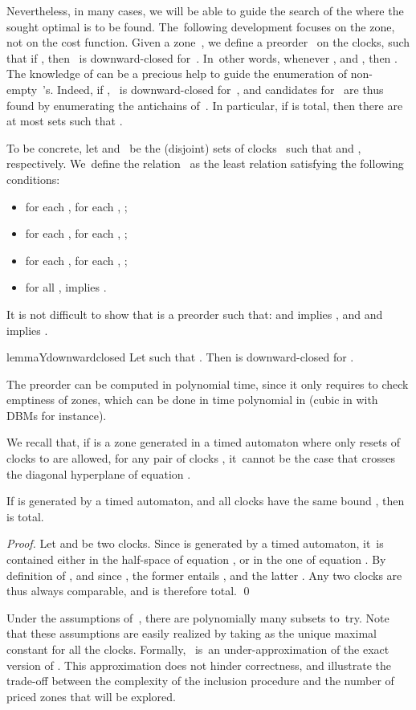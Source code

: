 Nevertheless, in many cases, we will be able to guide the search of the 
where the sought optimal is to be found.
The~following development
focuses on the zone, not on the cost function. Given a zone~, we define a
preorder~ on the clocks, such that if , then
~is downward-closed for~. In~other words, whenever ,
 and , then . The knowledge of 
can be a precious help to guide the enumeration of non-empty~'s.
Indeed, if , ~is downward-closed for~, and
candidates for~ are thus found by enumerating the antichains of~.
In particular, if  is total, then there are at most  sets 
such that .

To be concrete, 
let  and~ be the (disjoint) sets of clocks~ such that  and , respectively.
We~define the relation~ as the
least
relation satisfying the following conditions:
\begin{itemize}
\item for each , for each , ;
\item for each , for each , ;
\item for each , for each , ;
\item for all ,  implies .
\end{itemize}
It is not difficult to show that  is a preorder such that:
 and  implies , and
 and  implies .

\begin{restatable}{lemma}{Ydownwardclosed}
  Let  such that . Then  is
  downward-closed for .
\end{restatable}

The preorder  can be computed in polynomial time, since it
only requires to check emptiness of zones, which can be done in time
polynomial in  (cubic in  with DBMs for instance).

We recall that, if  is a zone generated in a timed automaton where
only resets of clocks to  are allowed, for any pair of clocks
, it~cannot be the case that  crosses the diagonal hyperplane of
equation . 

\begin{proposition}
  \label{prop:total_samebound}
  If  is generated by a timed automaton, and all clocks have the
  same bound , then  is total.
\end{proposition}

\begin{proof}
  Let  and  be two clocks. Since  is generated by a timed automaton,
  it~is contained either in the half-space of equation , or in the
  one of equation . By definition of , and since , the former entails , and the latter .
  Any two clocks are thus always comparable, and  is therefore
  total. \qed
\end{proof}

Under the assumptions of~, there are
polynomially many subsets  to~try.
  Note that these assumptions are easily realized by taking
   as the unique maximal constant for
  all the clocks.
  Formally, ~is~an under-approximation of
  the exact version of .  This approximation does not
  hinder correctness, and illustrate the trade-off between the
  complexity of the inclusion procedure and the number of priced zones
  that will be explored.
